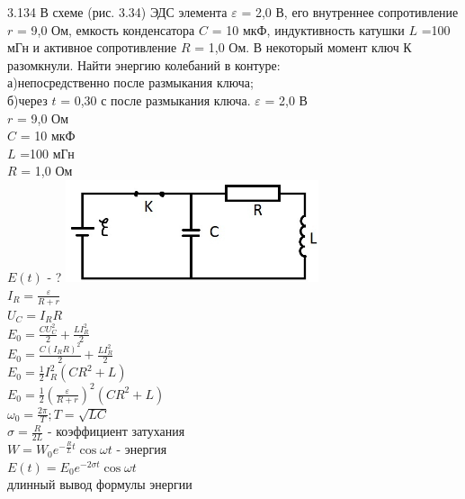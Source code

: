 \testCom
{3.134}
{
	В схеме (рис. 3.34) ЭДС элемента $\varepsilon$ = 2,0 В, его внутреннее сопротивление $r$ = 9,0 Ом, 		емкость конденсатора $C$ = 10 мкФ, индуктивность катушки $L$ =100 мГн и активное сопротивление $R$ = 	1,0 Ом. В некоторый момент ключ К разомкнули. Найти энергию колебаний в контуре:\\
	а)непосредственно после размыкания ключа;\\
	б)через $t$ = 0,30 с после размыкания ключа.
}
{%
	$\varepsilon$ = 2,0 В\\
	$r$ = 9,0 Ом\\
	$C$ = 10 мкФ\\
	$L$ =100 мГн\\
	$R$ = 1,0 Ом\\
}
{%
	$E(t)$ - ?
}
{%
	\includegraphics[height=30mm]{3_134.jpg}\\
	${I}_{R}=\frac{\varepsilon}{R+r}$\\
	${U}_{C}={I}_{R}R$\\
	${E}_{0}=\frac{C{U}_{C}^2}{2}+\frac{L{I}_{R}^2}{2}$\\
	${E}_{0}=\frac{C({I}_{R}R)^2}{2}+\frac{L{I}_{R}^2}{2}$\\
	${E}_{0}=\frac{1}{2}{I}_{R}^2(CR^2+L)$\\

	${E}_{0}=\frac{1}{2}(\frac{\varepsilon}{R+r})^2 (CR^2 + L)$\\

	${\omega}_{0}=\frac{2\pi}{T}; T=\sqrt{LC}$\\
	$\sigma=\frac{R}{2L}$ - коэффициент затухания\\  
	$W={W}_{0}e^{-\frac{R}{L}t} \cos\omega t$ - энергия\\
	$E(t) = {E}_{0}e^{-2\sigma t} \cos\omega t$\\
	длинный вывод формулы энергии\\
}

